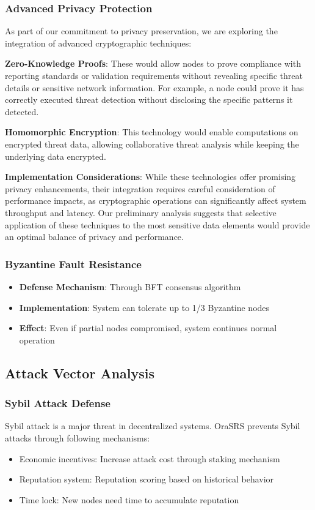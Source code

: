 \documentclass[12pt]{article}
\begin{document}
\subsubsection{Advanced Privacy Protection}
As part of our commitment to privacy preservation, we are exploring the integration of advanced cryptographic techniques:

\textbf{Zero-Knowledge Proofs}: These would allow nodes to prove compliance with reporting standards or validation requirements without revealing specific threat details or sensitive network information. For example, a node could prove it has correctly executed threat detection without disclosing the specific patterns it detected.

\textbf{Homomorphic Encryption}: This technology would enable computations on encrypted threat data, allowing collaborative threat analysis while keeping the underlying data encrypted.

\textbf{Implementation Considerations}: While these technologies offer promising privacy enhancements, their integration requires careful consideration of performance impacts, as cryptographic operations can significantly affect system throughput and latency. Our preliminary analysis suggests that selective application of these techniques to the most sensitive data elements would provide an optimal balance of privacy and performance.

\subsubsection{Byzantine Fault Resistance}
\begin{itemize}
\item \textbf{Defense Mechanism}: Through BFT consensus algorithm
\item \textbf{Implementation}: System can tolerate up to 1/3 Byzantine nodes
\item \textbf{Effect}: Even if partial nodes compromised, system continues normal operation
\end{itemize}

\subsection{Attack Vector Analysis}

\subsubsection{Sybil Attack Defense}
Sybil attack is a major threat in decentralized systems. OraSRS prevents Sybil attacks through following mechanisms:
\begin{itemize}
\item Economic incentives: Increase attack cost through staking mechanism
\item Reputation system: Reputation scoring based on historical behavior
\item Time lock: New nodes need time to accumulate reputation
\end{itemize}
\end{document}
